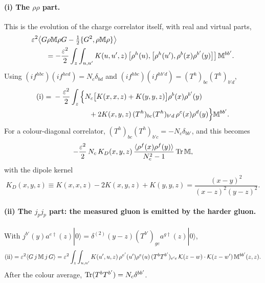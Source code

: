 \paragraph*{(i) The $\rho\rho$ part.} This is the evolution of the charge correlator itself, with real and virtual parts,
\begin{align}
&\varepsilon^2\big\langle G\rho\mathbb M\rho G-\tfrac12\{G^2,\rho\mathbb M\rho\}\big\rangle\notag\\
&\qquad=-\frac{\varepsilon^2}{2}\int_z\int_{u,u'}K(u,u',z)\,\big[\rho^h(u),\big[\rho^h(u'),\rho^b(x)\rho^{b'}(y)\big]\big]\,\mathbb M^{bb'}.
\end{align}
Using $(if^{hbc})(if^{hcd})=N_c\delta_{bd}$ and $(if^{hbc})(if^{hb'd})=(T^h)_{bc}(T^h)_{b'd}$,
\begin{align}
\text{(i)}={}&-\frac{\varepsilon^2}{2}\int_z\Big\{N_c\big[K(x,x,z)+K(y,y,z)\big]\rho^b(x)\rho^{b'}(y)\notag\\
&\hspace{5em}+2K(x,y,z)\,(T^h)_{bc}(T^h)_{b'd}\,\rho^c(x)\rho^d(y)\Big\}\mathbb M^{bb'}.
\end{align}
For a colour-diagonal correlator, $(T^h)_{bc}(T^h)_{b'c}=-N_c\delta_{bb'}$, and this becomes
\begin{equation}
-\frac{\varepsilon^2}{2}\,N_c\,K_D(x,y,z)\,\frac{\langle\rho^f(x)\rho^f(y)\rangle}{N_c^2-1}\,\mathrm{Tr}\,\mathbb M,
\end{equation}
with the dipole kernel
\begin{equation}
K_D(x,y,z)\equiv K(x,x,z)-2K(x,y,z)+K(y,y,z)=\frac{(x-y)^2}{(x-z)^2(y-z)^2}.
\label{eq:KD}
\end{equation}

\paragraph*{(ii) The $j_pj_p$ part: the measured gluon is emitted by the harder gluon.} With $j^{b'}(y)a^{e\dagger}(z)|0\rangle=\delta^{(2)}(y-z)(T^{b'})_{ge}a^{g\dagger}(z)|0\rangle$,
\begin{equation}
\text{(ii)}=\varepsilon^2\langle G\,j\,\mathbb M\,j\,G\rangle=\varepsilon^2\int_z\int_{u,u'}K(u',u,z)\,\rho^{e'}(u')\rho^e(u)\,(T^bT^{b'})_{e'e}\,\mathcal{K}(z-w)\cdot\mathcal{K}(z-w')\,\mathbb M^{bb'}(z,z).
\end{equation}
After the colour average, $\mathrm{Tr}(T^bT^{b'})=N_c\delta^{bb'}$.

